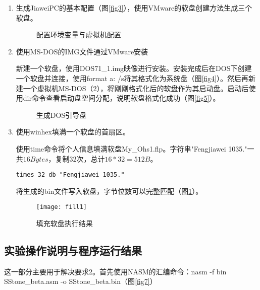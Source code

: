\documentclass[a4paper,11pt,UTF8]{ctexart}
\begin{document}
	\begin{enumerate}
		\item 生成JiaweiPC的基本配置（图\ref{fig3}），使用VMware的软盘创建方法生成三个软盘。
		
		\begin{figure}[htbp]
			\centering
			\quad
			\caption{配置环境变量与虚拟机配置}
		\end{figure}
	
		\item 使用MS-DOS的IMG文件通过VMware安装
		
		新建一个软盘，使用DOS71\_1.img映像进行安装。安装完成后在DOS下创建一个软盘并连接，使用format a: /s将其格式化为系统盘（图\ref{fig4}）。然后再新建一个虚拟机MS-DOS（2），将刚刚格式化后的软盘作为其启动盘。启动后使用dir命令查看启动盘空间分配，说明软盘格式化成功（图\ref{fig5}）。
		
		
		\begin{figure}[htbp]
			\centering	
			\quad
			\caption{生成DOS引导盘}
		\end{figure}
	
		\item 使用winhex填满一个软盘的首扇区。
		
		使用time命令将个人信息填满软盘My\_Ohs1.flp。字符串"Fengjiawei 1035."一共$16 Bytes$，复制$32$次，总计$16*32 = 512 B$。
		\begin{lstlisting}[caption={fillinfo.asm},tabsize=4,basicstyle=\footnotesize,captionpos=b]
	times 32 db "Fengjiawei 1035."
		\end{lstlisting}
	将生成的bin文件写入软盘，字节位数可以完整匹配（图\ref{fig6}）。
	\begin{figure}[htbp]
	\centering	
	\texttt{[image: fill1]}
	\caption{填充软盘执行结果}
	\label{fig6}
	\end{figure}
		
		
		
	\end{enumerate}
\subsection{实验操作说明与程序运行结果}
	这一部分主要用于解决要求2。首先使用NASM的汇编命令：nasm -f bin SStone\_beta.asm -o SStone\_beta.bin（图\ref{fig7}）
	
\end{document}
